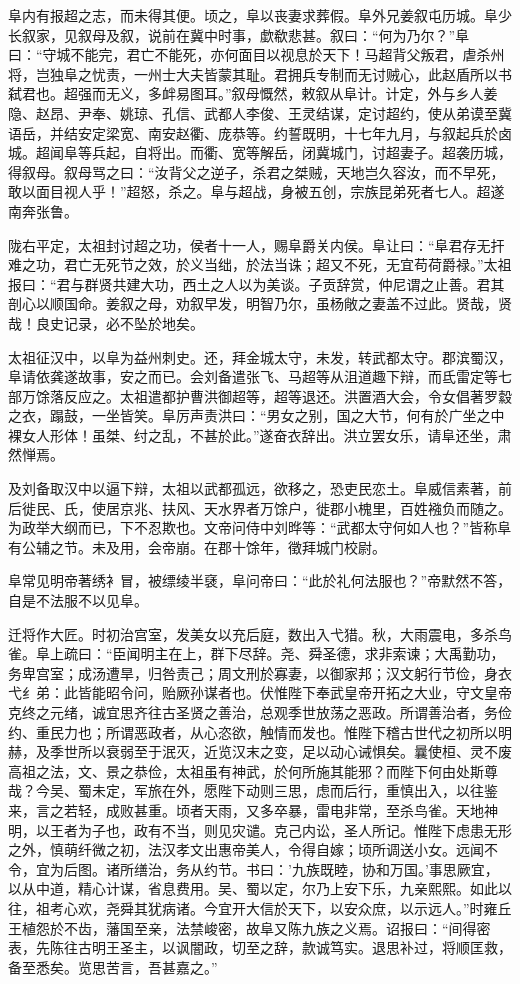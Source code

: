\documentclass[12pt,UTF8]{ctexbook}
\begin{document}
阜内有报超之志，而未得其便。顷之，阜以丧妻求葬假。阜外兄姜叙屯历城。阜少长叙家，见叙母及叙，说前在冀中时事，歔欷悲甚。叙曰：“何为乃尔？”阜曰：“守城不能完，君亡不能死，亦何面目以视息於天下！马超背父叛君，虐杀州将，岂独阜之忧责，一州士大夫皆蒙其耻。君拥兵专制而无讨贼心，此赵盾所以书弑君也。超强而无义，多衅易图耳。”叙母慨然，敕叙从阜计。计定，外与乡人姜隐、赵昂、尹奉、姚琼、孔信、武都人李俊、王灵结谋，定讨超约，使从弟谟至冀语岳，并结安定梁宽、南安赵衢、庞恭等。约誓既明，十七年九月，与叙起兵於卤城。超闻阜等兵起，自将出。而衢、宽等解岳，闭冀城门，讨超妻子。超袭历城，得叙母。叙母骂之曰：“汝背父之逆子，杀君之桀贼，天地岂久容汝，而不早死，敢以面目视人乎！”超怒，杀之。阜与超战，身被五创，宗族昆弟死者七人。超遂南奔张鲁。

陇右平定，太祖封讨超之功，侯者十一人，赐阜爵关内侯。阜让曰：“阜君存无扞难之功，君亡无死节之效，於义当绌，於法当诛；超又不死，无宜苟荷爵禄。”太祖报曰：“君与群贤共建大功，西土之人以为美谈。子贡辞赏，仲尼谓之止善。君其剖心以顺国命。姜叙之母，劝叙早发，明智乃尔，虽杨敞之妻盖不过此。贤哉，贤哉！良史记录，必不坠於地矣。

太祖征汉中，以阜为益州刺史。还，拜金城太守，未发，转武都太守。郡滨蜀汉，阜请依龚遂故事，安之而已。会刘备遣张飞、马超等从沮道趣下辩，而氐雷定等七部万馀落反应之。太祖遣都护曹洪御超等，超等退还。洪置酒大会，令女倡著罗縠之衣，蹋鼓，一坐皆笑。阜厉声责洪曰：“男女之别，国之大节，何有於广坐之中裸女人形体！虽桀、纣之乱，不甚於此。”遂奋衣辞出。洪立罢女乐，请阜还坐，肃然惮焉。

及刘备取汉中以逼下辩，太祖以武都孤远，欲移之，恐吏民恋土。阜威信素著，前后徙民、氏，使居京兆、扶风、天水界者万馀户，徙郡小槐里，百姓襁负而随之。为政举大纲而已，下不忍欺也。文帝问侍中刘晔等：“武都太守何如人也？”皆称阜有公辅之节。未及用，会帝崩。在郡十馀年，徵拜城门校尉。

阜常见明帝著绣衤冒，被缥绫半褎，阜问帝曰：“此於礼何法服也？”帝默然不答，自是不法服不以见阜。

迁将作大匠。时初治宫室，发美女以充后庭，数出入弋猎。秋，大雨震电，多杀鸟雀。阜上疏曰：“臣闻明主在上，群下尽辞。尧、舜圣德，求非索谏；大禹勤功，务卑宫室；成汤遭旱，归咎责己；周文刑於寡妻，以御家邦；汉文躬行节俭，身衣弋纟弟：此皆能昭令问，贻厥孙谋者也。伏惟陛下奉武皇帝开拓之大业，守文皇帝克终之元绪，诚宜思齐往古圣贤之善治，总观季世放荡之恶政。所谓善治者，务俭约、重民力也；所谓恶政者，从心恣欲，触情而发也。惟陛下稽古世代之初所以明赫，及季世所以衰弱至于泯灭，近览汉末之变，足以动心诫惧矣。曩使桓、灵不废高祖之法，文、景之恭俭，太祖虽有神武，於何所施其能邪？而陛下何由处斯尊哉？今吴、蜀未定，军旅在外，愿陛下动则三思，虑而后行，重慎出入，以往鉴来，言之若轻，成败甚重。顷者天雨，又多卒暴，雷电非常，至杀鸟雀。天地神明，以王者为子也，政有不当，则见灾谴。克己内讼，圣人所记。惟陛下虑患无形之外，慎萌纤微之初，法汉孝文出惠帝美人，令得自嫁；顷所调送小女。远闻不令，宜为后图。诸所缮治，务从约节。书曰：'九族既睦，协和万国。'事思厥宜，以从中道，精心计谋，省息费用。吴、蜀以定，尔乃上安下乐，九亲熙熙。如此以往，祖考心欢，尧舜其犹病诸。今宜开大信於天下，以安众庶，以示远人。”时雍丘王植怨於不齿，藩国至亲，法禁峻密，故阜又陈九族之义焉。诏报曰：“间得密表，先陈往古明王圣主，以讽闇政，切至之辞，款诚笃实。退思补过，将顺匡救，备至悉矣。览思苦言，吾甚嘉之。”
\end{document}

